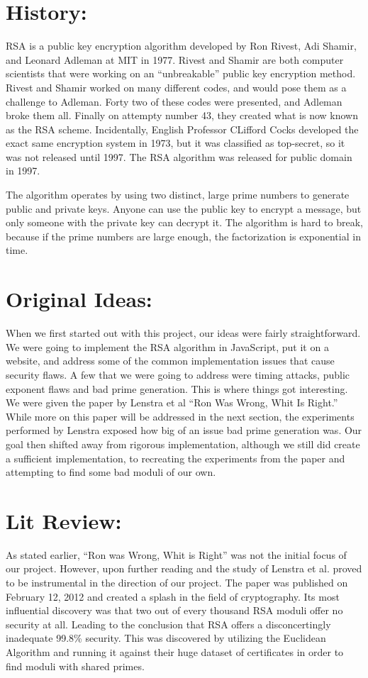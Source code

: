 \documentclass[11pt,twoside]{article}
\begin{document}
\begin{multicols}{2}
\section{History:}
\lettrine[nindent=0em,lines=3]{R} SA is a public key encryption algorithm 
developed by Ron Rivest, Adi Shamir, 
and Leonard Adleman at MIT in 1977. Rivest and Shamir are both computer
scientists that were working on an ``unbreakable'' public key encryption method.
Rivest and Shamir worked on many different codes, and would pose them as a
challenge to Adleman. Forty two of these codes were presented, and Adleman broke
them all. Finally on attempty number 43, they created what is now known as the
RSA scheme. Incidentally, English Professor CLifford Cocks developed the exact
same encryption system in 1973, but it was classified as top-secret, so it was
not released until 1997. The RSA algorithm was released for public domain in
1997.

The algorithm operates by using two distinct, large prime numbers to generate
public and private keys. Anyone can use the public key to encrypt a message, but
only someone with the private key can decrypt it. The algorithm is hard to
break, because if the prime numbers are large enough, the factorization is
exponential in time. 

\section{Original Ideas:}
When we first started out with this project, our ideas were fairly
straightforward. We were going to implement the RSA algorithm in JavaScript, put
it on a website, and address some of the common implementation issues that cause
security flaws. A few that we were going to address were timing attacks, public
exponent flaws and bad prime generation. This is where things got interesting.
We were given the paper by Lenstra et al ``Ron Was Wrong, Whit Is Right.'' While
more on this paper will be addressed in the next section, the experiments
performed by Lenstra exposed how big of an issue bad prime generation was. Our
goal then shifted away from rigorous implementation, although we still did
create a sufficient implementation, to recreating the experiments from the paper
and attempting to find some bad moduli of our own.

\section{Lit Review:}
As stated earlier, “Ron was Wrong, Whit is Right” was not the initial focus of
our project. However, upon further reading and the study of Lenstra et al.
proved to be instrumental in the direction of our project. The paper was
published on February 12, 2012 and created a splash in the field of
cryptography. Its most influential discovery was that two out of every thousand
RSA moduli offer no security at all. Leading to the conclusion that RSA offers a
disconcertingly inadequate 99.8\% security. This was discovered by utilizing the
Euclidean Algorithm and running it against their huge dataset of certificates in
order to find moduli with shared primes.


\end{multicols}
\end{document}
